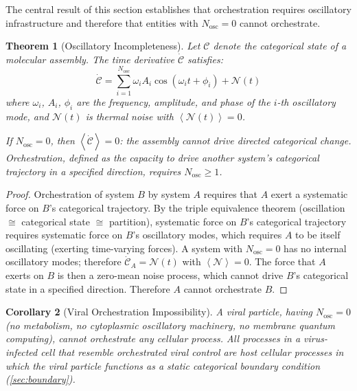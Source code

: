 \documentclass[12pt,a4paper]{article}
\newtheorem{theorem}{Theorem}[section]
\newtheorem{corollary}[theorem]{Corollary}
\theoremstyle{definition}
\theoremstyle{remark}
\newcommand{\Nosc}{N_{\mathrm{osc}}}
\newcommand{\avg}[1]{\left\langle #1 \right\rangle}
\begin{document}
The central result of this section establishes that orchestration requires oscillatory infrastructure and therefore that entities with $\Nosc = 0$ cannot orchestrate.

\begin{theorem}[Oscillatory Incompleteness]
\label{thm:OIT}
Let $\mathcal{C}$ denote the categorical state of a molecular assembly. The time derivative $\dot{\mathcal{C}}$ satisfies:
\begin{equation}
  \dot{\mathcal{C}} = \sum_{i=1}^{\Nosc} \omega_i A_i \cos(\omega_i t + \phi_i) + \mathcal{N}(t)
  \label{eq:Cdot}
\end{equation}
where $\omega_i$, $A_i$, $\phi_i$ are the frequency, amplitude, and phase of the $i$-th oscillatory mode, and $\mathcal{N}(t)$ is thermal noise with $\avg{\mathcal{N}(t)} = 0$.

If $\Nosc = 0$, then $\avg{\dot{\mathcal{C}}} = 0$: the assembly cannot drive directed categorical change. Orchestration, defined as the capacity to drive another system's categorical trajectory in a specified direction, requires $\Nosc \geq 1$.
\end{theorem}

\begin{proof}
Orchestration of system $B$ by system $A$ requires that $A$ exert a systematic force on $B$'s categorical trajectory. By the triple equivalence theorem (oscillation $\cong$ categorical state $\cong$ partition), systematic force on $B$'s categorical trajectory requires systematic force on $B$'s oscillatory modes, which requires $A$ to be itself oscillating (exerting time-varying forces). A system with $\Nosc = 0$ has no internal oscillatory modes; therefore $\dot{\mathcal{C}}_A = \mathcal{N}(t)$ with $\avg{\mathcal{N}} = 0$. The force that $A$ exerts on $B$ is then a zero-mean noise process, which cannot drive $B$'s categorical state in a specified direction. Therefore $A$ cannot orchestrate $B$.
\end{proof}

\begin{corollary}[Viral Orchestration Impossibility]
\label{cor:viral_impossibility}
A viral particle, having $\Nosc = 0$ (no metabolism, no cytoplasmic oscillatory machinery, no membrane quantum computing), cannot orchestrate any cellular process. All processes in a virus-infected cell that resemble orchestrated viral control are host cellular processes in which the viral particle functions as a static categorical boundary condition (\cref{sec:boundary}).
\end{corollary}
\end{document}
